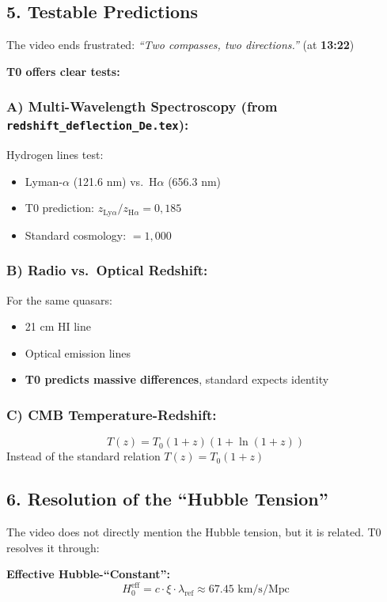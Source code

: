 \documentclass{article}
\begin{document}
	\subsection{5. Testable Predictions}
	
	The video ends frustrated: \textit{``Two compasses, two directions.''} (at \textbf{13:22})
	
	\textbf{T0 offers clear tests:}
	
	\subsubsection{A) Multi-Wavelength Spectroscopy (from \texttt{redshift\_deflection\_De.tex}):}
	
	Hydrogen lines test:
	\begin{itemize}
		\item Lyman-$\alpha$ (121.6 nm) vs.\ H$\alpha$ (656.3 nm)
		\item T0 prediction: $z_{\mathrm{Ly}\alpha} / z_{\mathrm{H}\alpha} = 0{,}185$
		\item Standard cosmology: $= 1{,}000$
	\end{itemize}
	
	\subsubsection{B) Radio vs.\ Optical Redshift:}
	For the same quasars:
	\begin{itemize}
		\item 21 cm HI line
		\item Optical emission lines
		\item \textbf{T0 predicts massive differences}, standard expects identity
	\end{itemize}
	
	\subsubsection{C) CMB Temperature-Redshift:}
	$$T(z) = T_0(1+z)(1+\ln(1+z))$$
	Instead of the standard relation $T(z) = T_0(1+z)$
	
	\subsection{6. Resolution of the ``Hubble Tension''}
	
	The video does not directly mention the Hubble tension, but it is related. T0 resolves it through:
	
	\textbf{Effective Hubble-``Constant'':}
	$$H_0^{\text{eff}} = c \cdot \xi \cdot \lambda_{\text{ref}} \approx 67.45 \text{ km/s/Mpc}$$
	
\end{document}
